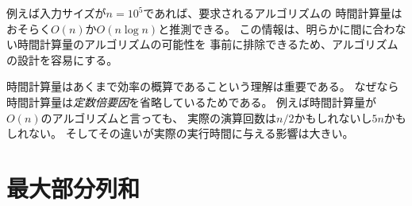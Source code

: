 \begin{comment}
For example, if the input size is $n=10^5$,
it is probably expected that the time
complexity of the algorithm is $O(n)$ or $O(n \log n)$.
This information makes it easier to design the algorithm,
because it rules out approaches that would yield
an algorithm with a worse time complexity.
\end{comment}

例えば入力サイズが$n=10^5$であれば、要求されるアルゴリズムの
時間計算量はおそらく$O(n)$か$O(n \log n)$と推測できる。
この情報は、明らかに間に合わない時間計算量のアルゴリズムの可能性を
事前に排除できるため、アルゴリズムの設計を容易にする。



\begin{comment}
Still, it is important to remember that a
time complexity is only an estimate of efficiency,
because it hides the \emph{constant factors}.
For example, an algorithm that runs in $O(n)$ time
may perform $n/2$ or $5n$ operations.
This has an important effect on the actual
running time of the algorithm.
\end{comment}

時間計算量はあくまで効率の概算であるこという理解は重要である。
なぜなら時間計算量は\emph{定数倍要因}を省略しているためである。
例えば時間計算量が$O(n)$のアルゴリズムと言っても、
実際の演算回数は$n/2$かもしれないし$5n$かもしれない。
そしてその違いが実際の実行時間に与える影響は大きい。

\begin{comment}
\section{Maximum subarray sum}

\index{maximum subarray sum}

There are often several possible algorithms
for solving a problem such that their
time complexities are different.
This section discusses a classic problem that
has a straightforward $O(n^3)$ solution.
However, by designing a better algorithm, it
is possible to solve the problem in $O(n^2)$
time and even in $O(n)$ time.
\end{comment}

\section{最大部分列和}


